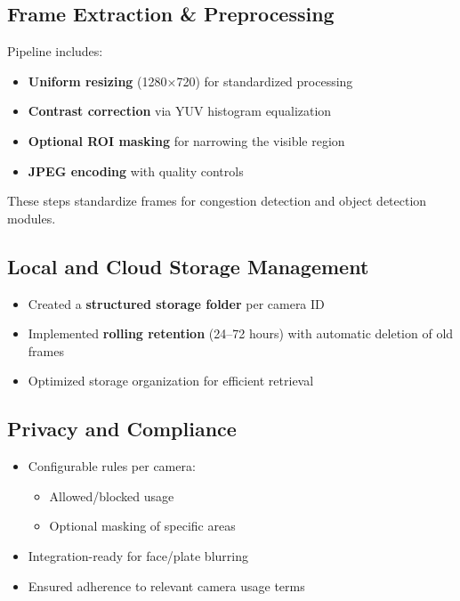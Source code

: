 \subsection{Frame Extraction \& Preprocessing}

Pipeline includes:

\begin{itemize}
    \item \textbf{Uniform resizing} (1280×720) for standardized processing
    \item \textbf{Contrast correction} via YUV histogram equalization
    \item \textbf{Optional ROI masking} for narrowing the visible region
    \item \textbf{JPEG encoding} with quality controls
\end{itemize}

These steps standardize frames for congestion detection and object detection modules.

\subsection{Local and Cloud Storage Management}

\begin{itemize}
    \item Created a \textbf{structured storage folder} per camera ID
    \item Implemented \textbf{rolling retention} (24–72 hours) with automatic deletion of old frames
    \item Optimized storage organization for efficient retrieval
\end{itemize}

\subsection{Privacy and Compliance}

\begin{itemize}
    \item Configurable rules per camera:
    \begin{itemize}
        \item Allowed/blocked usage
        \item Optional masking of specific areas
    \end{itemize}
    \item Integration-ready for face/plate blurring
    \item Ensured adherence to relevant camera usage terms
\end{itemize}

